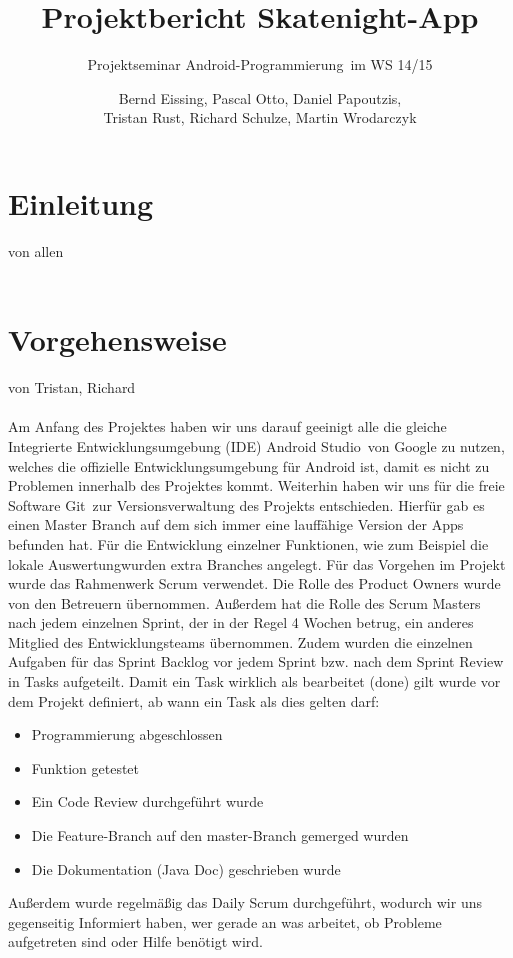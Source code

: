 \documentclass[a4paper, titlepage]{scrartcl}
\title{Projektbericht Skatenight-App}
\subtitle{Projektseminar \glqq Android-Programmierung\grqq\ im WS 14/15}
\author{Bernd Eissing, Pascal Otto, Daniel Papoutzis,\\Tristan Rust, Richard Schulze, Martin Wrodarczyk}
\date{}
\newcommand{\AUTHOR}[1]{
	von #1 \\ \\
}
\begin{document}
\maketitle

\tableofcontents
\newpage

\section{Einleitung}
\AUTHOR{allen}



\section{Vorgehensweise}
\AUTHOR{Tristan, Richard}
Am Anfang des Projektes haben wir uns darauf geeinigt alle die gleiche Integrierte Entwicklungsumgebung (IDE) \glqq Android Studio\grqq\ von Google zu nutzen, welches die offizielle Entwicklungsumgebung für Android ist, damit es nicht zu Problemen innerhalb des Projektes kommt.
Weiterhin haben wir uns für die freie Software \glqq Git\grqq\ zur Versionsverwaltung des Projekts entschieden. Hierfür gab es einen Master Branch auf dem sich immer eine lauffähige Version der Apps befunden hat. Für die Entwicklung einzelner Funktionen, wie zum Beispiel die \glqq lokale Auswertung\grqq wurden extra Branches angelegt.
Für das Vorgehen im Projekt wurde das Rahmenwerk Scrum verwendet. Die Rolle des Product Owners wurde von den Betreuern übernommen. Außerdem hat die Rolle des Scrum Masters nach jedem einzelnen Sprint, der in der Regel 4 Wochen betrug, ein anderes Mitglied des Entwicklungsteams übernommen. Zudem wurden die einzelnen Aufgaben für das Sprint Backlog vor jedem Sprint bzw. nach dem Sprint Review in Tasks aufgeteilt. Damit ein Task wirklich als bearbeitet (\glqq done\grqq) gilt wurde vor dem Projekt definiert, ab wann ein Task als dies gelten darf:

\begin{itemize}
	\item Programmierung abgeschlossen
	\item Funktion getestet
	\item Ein Code Review durchgeführt wurde
	\item Die Feature-Branch auf den master-Branch gemerged wurden
	\item Die Dokumentation (Java Doc) geschrieben wurde
\end{itemize}

Außerdem wurde regelmäßig das Daily Scrum durchgeführt, wodurch wir uns gegenseitig Informiert haben, wer gerade an was arbeitet, ob Probleme aufgetreten sind oder Hilfe benötigt wird.
\end{document}
